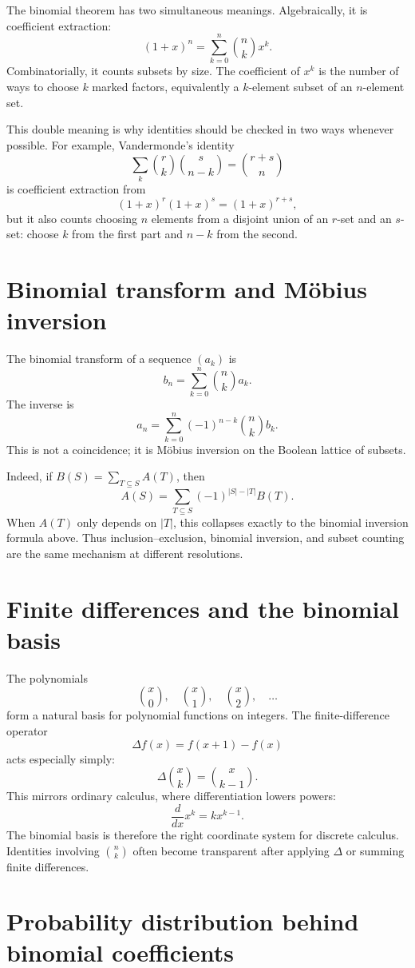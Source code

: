 The binomial theorem has two simultaneous meanings.  Algebraically, it is coefficient extraction:
\[
  (1+x)^n=\sum_{k=0}^{n}\binom nk x^k.
\]
Combinatorially, it counts subsets by size.  The coefficient of \(x^k\) is the number of ways to choose \(k\) marked factors, equivalently a \(k\)-element subset of an \(n\)-element set.

This double meaning is why identities should be checked in two ways whenever possible.  For example, Vandermonde's identity
\[
  \sum_k \binom rk\binom s{n-k}=\binom{r+s}{n}
\]
is coefficient extraction from
\[
  (1+x)^r(1+x)^s=(1+x)^{r+s},
\]
but it also counts choosing \(n\) elements from a disjoint union of an \(r\)-set and an \(s\)-set: choose \(k\) from the first part and \(n-k\) from the second.

\section{Binomial transform and Möbius inversion}

The binomial transform of a sequence \((a_k)\) is
\[
  b_n=\sum_{k=0}^n \binom nk a_k.
\]
The inverse is
\[
  a_n=\sum_{k=0}^n(-1)^{n-k}\binom nk b_k.
\]
This is not a coincidence; it is Möbius inversion on the Boolean lattice of subsets.

Indeed, if \(B(S)=\sum_{T\subseteq S}A(T)\), then
\[
  A(S)=\sum_{T\subseteq S}(-1)^{|S|-|T|}B(T).
\]
When \(A(T)\) only depends on \(|T|\), this collapses exactly to the binomial inversion formula above.  Thus inclusion--exclusion, binomial inversion, and subset counting are the same mechanism at different resolutions.

\section{Finite differences and the binomial basis}

The polynomials
\[
  \binom x0,\quad \binom x1,\quad \binom x2,\quad\ldots
\]
form a natural basis for polynomial functions on integers.  The finite-difference operator
\[
  \Delta f(x)=f(x+1)-f(x)
\]
acts especially simply:
\[
  \Delta \binom xk=\binom x{k-1}.
\]
This mirrors ordinary calculus, where differentiation lowers powers:
\[
  \frac{d}{dx}x^k=kx^{k-1}.
\]
The binomial basis is therefore the right coordinate system for discrete calculus.  Identities involving \(\binom nk\) often become transparent after applying \(\Delta\) or summing finite differences.

\section{Probability distribution behind binomial coefficients}

